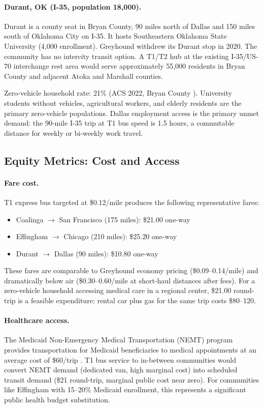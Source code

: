 \paragraph{Durant, OK (I-35, population 18,000).}

Durant is a county seat in Bryan County, 90 miles north of Dallas and 150 miles south of Oklahoma City on I-35. It hosts Southeastern Oklahoma State University (4,000 enrollment). Greyhound withdrew its Durant stop in 2020. The community has no intercity transit option. A T1/T2 hub at the existing I-35/US-70 interchange rest area would serve approximately 55,000 residents in Bryan County and adjacent Atoka and Marshall counties.

Zero-vehicle household rate: 21\% (ACS 2022, Bryan County \citep{ACS_B08201_2022}). University students without vehicles, agricultural workers, and elderly residents are the primary zero-vehicle populations. Dallas employment access is the primary unmet demand: the 90-mile I-35 trip at T1 bus speed is 1.5 hours, a commutable distance for weekly or bi-weekly work travel.

\subsection{Equity Metrics: Cost and Access}

\paragraph{Fare cost.} T1 express bus targeted at \$0.12/mile produces the following representative fares:
\begin{itemize}
  \item Coalinga $\rightarrow$ San Francisco (175 miles): \$21.00 one-way
  \item Effingham $\rightarrow$ Chicago (210 miles): \$25.20 one-way
  \item Durant $\rightarrow$ Dallas (90 miles): \$10.80 one-way
\end{itemize}

These fares are comparable to Greyhound economy pricing (\$0.09--0.14/mile) and dramatically below air (\$0.30--0.60/mile at short-haul distances after fees). For a zero-vehicle household accessing medical care in a regional center, \$21.00 round-trip is a feasible expenditure; rental car plus gas for the same trip costs \$80--120.

\paragraph{Healthcare access.} The Medicaid Non-Emergency Medical Transportation (NEMT) program provides transportation for Medicaid beneficiaries to medical appointments at an average cost of \$60/trip \citep{BTS_intermodal2023}. T1 bus service to in-between communities would convert NEMT demand (dedicated van, high marginal cost) into scheduled transit demand (\$21 round-trip, marginal public cost near zero). For communities like Effingham with 15--20\% Medicaid enrollment, this represents a significant public health budget substitution.

